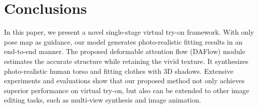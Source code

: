 \documentclass[runningheads]{llncs}
\begin{document}
\section{Conclusions}
In this paper, we present a novel single-stage virtual try-on framework. With only pose map as guidance, our model generates photo-realistic fitting results in an end-to-end manner. The proposed deformable attention flow (DAFlow) module estimates the accurate structure while retaining the vivid texture. It synthesizes photo-realistic human torso and fitting clothes with 3D shadows. Extensive experiments and evaluations show that our proposed method not only achieves superior performance on virtual try-on, but also can be extended to other image editing tasks, such as multi-view synthesis and image animation.
\clearpage


\end{document}
